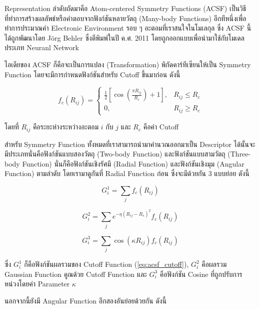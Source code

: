 Representation ลำดับถัดมาคือ Atom-centered Symmetry Functions (ACSF) เป็นวิธีที่ทำการสร้างผลลัพธ์หรือคำตอบจากฟังก์ชันหลายวัตถุ
(Many-body Functions) อีกทีหนึ่งเพื่อทำการประมาณค่า Electronic Environment รอบ ๆ อะตอมที่เราสนใจในโมเลกุล
ซึ่ง ACSF นี้ได้ถูกพัฒนาโดย J{\"o}rg Behler ซึ่งตีพิมพ์ในปี ค.ศ. 2011 โดยถูกออกแบบเพื่อนำมาใช้กับโมเดลประเภท Neuranl Network
\autocite{behler2011a}

ไอเดียของ ACSF ก็คือจะเป็นการแปลง (Transformation) พิกัดคาร์ทีเซียนให้เป็น Symmetry Function โดยจะมีการกำหนดฟังก์ชันสำหรับ 
Cutoff ขึ้นมาก่อน ดังนี้

\begin{equation}
    \label{eq:acsf_cutoff}
    f_{c}(R_{ij}) = 
    \begin{cases}
        \frac{1}{2}[\cos(\frac{\pi R_{ij}}{R_{c}}) + 1], & R_{ij} \le R_{c} \\
        0,                                             & R_{ij} \ge R_{c}
    \end{cases}
\end{equation}

\noindent โดยที่ $R_{ij}$ คือระยะห่างระหว่างอะตอม $i$ กับ $j$ และ $R_{c}$ คือค่า Cutoff

สำหรับ Symmetry Function ทั้งหมดที่เราสามารถนำมาคำนวณออกมาเป็น Descriptor ได้นั้นจะมีประเภทนั่นคือฟังก์ชันแบบสองวัตถุ
(Two-body Function) และฟังก์ชันแบบสามวัตถุ (Three-body Function) นั่นก็คือฟังก์ชันเชิงรัศมี (Radial Function) และฟังก์ชันเชิงมุม 
(Angular Function) ตามลำดับ โดยเรามาดูกันที่ Radial Function ก่อน ซึ่งจะมีด้วยกัน 3 แบบย่อย ดังนี้

\begin{equation}
    G^{1}_{i} = \sum_{j} f_{c}(R_{ij})
\end{equation}

\begin{equation}
    G^{2}_{i} = \sum_{j} e^{-\eta(R_{ij} - R_{s})^{2}} f_{c}(R_{ij})
\end{equation}

\begin{equation}
    G^{3}_{i} = \sum_{j} \cos(\kappa R_{ij}) f_{c}(R_{ij})
\end{equation}

\noindent ซึ่ง $G^{1}_{i}$ ก็คือฟังก์ชันผลรวมของ Cutoff Function (\ref{eq:acsf_cutoff}), $G^{2}_{i}$ คือผลรวม Gaussian 
Function คูณด้วย Cutoff Function และ $G^{3}_{i}$ คือฟังก์ชัน Cosine ที่ถูกปรับการหน่วงโดยค่า Parameter $\kappa$ 

นอกจากนี้ยังมี Angular Function อีกสองอันย่อยด้วยกัน ดังนี้


